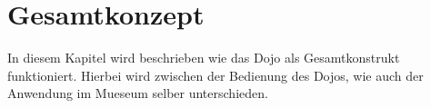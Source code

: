 \section{Gesamtkonzept}\label{sec:gesamtkonzept}
In diesem Kapitel wird beschrieben wie das Dojo als Gesamtkonstrukt funktioniert. Hierbei wird zwischen der Bedienung des Dojos, wie auch der Anwendung im Mueseum selber unterschieden. 
